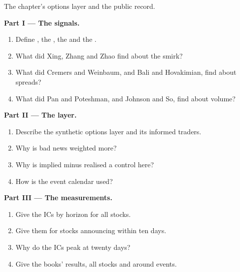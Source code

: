 \begin{problem}\label{pb:s1:options-implied-signals-for-stocks:1}
The chapter's options layer and the public record.

\medskip\noindent\textbf{Part I --- The signals.}
\begin{enumerate}
\item Define , the , the  and the .
\item What did Xing, Zhang and Zhao find about the smirk?
\item What did Cremers and Weinbaum, and Bali and Hovakimian, find about spreads?
\item What did Pan and Poteshman, and Johnson and So, find about volume?
\end{enumerate}

\medskip\noindent\textbf{Part II --- The layer.}
\begin{enumerate}[resume]
\item Describe the synthetic options layer and its informed traders.
\item Why is bad news weighted more?
\item Why is implied minus realised a control here?
\item How is the event calendar used?
\end{enumerate}

\medskip\noindent\textbf{Part III --- The measurements.}
\begin{enumerate}[resume]
\item Give the ICs by horizon for all stocks.
\item Give them for stocks announcing within ten days.
\item Why do the ICs peak at twenty days?
\item Give the books' results, all stocks and around events.
\end{enumerate}


\end{problem}
